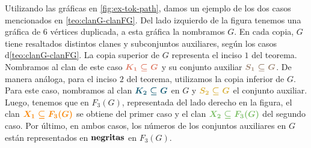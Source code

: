 Utilizando las gr\'aficas en \cref{fig:ex-tok-path}, damos un ejemplo de los dos
casos mencionados en \cref{teo:clanG-clanFG}. Del lado izquierdo de la figura
tenemos una gr\'afica de $6$ v\'ertices duplicada, a esta gr\'afica la nombramos
$G$. En cada copia, $G$ tiene resaltados distintos clanes y subconjuntos
auxiliares, seg\'un los casos d\cref{teo:clanG-clanFG}. La copia superior de $G$
representa el inciso $1$ del teorema. Nombramos al clan de este caso
${\color{salmon}\boldsymbol {K_1 \subseteq G}}$ y su conjunto auxiliar
${\color{baige}\boldsymbol {S_1\subseteq G}}$. De manera an\'aloga, para el
inciso $2$ del teorema, utilizamos la copia inferior de $G$. Para este caso,
nombramos al clan ${\color{azulOscuro}\boldsymbol {K_2\subseteq G}}$ en $G$ y
${\color{oro}\boldsymbol {S_2\subseteq G}}$ el conjunto auxiliar. Luego, tenemos
que en $F_3(G)$, representada del lado derecho en la figura, el clan
${\color{naranja}\boldsymbol {X_1\subseteq F_3(G)}}$ se obtiene del primer caso
y el clan ${\color{verde}\boldsymbol {X_2 \subseteq F_3(G)}}$ del segundo caso.
Por \'ultimo, en ambos casos, los n\'umeros de los conjuntos auxiliares en $G$
est\'an representados en ${\bf negritas}$ en $F_3(G)$.

